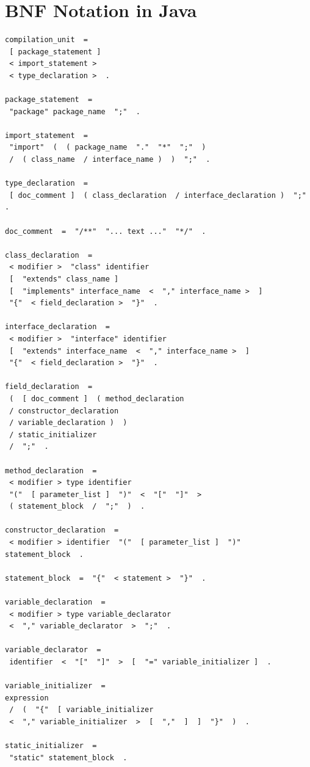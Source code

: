 \documentclass[
	12pt, %
]{fphw}
\begin{document}

\section*{{\color{Cerulean}BNF Notation in Java}}
\begin{verbatim}
compilation_unit  = 
 [ package_statement ] 
 < import_statement > 
 < type_declaration >  . 

package_statement  = 
 "package" package_name  ";"  . 

import_statement  = 
 "import"  (  ( package_name  "."  "*"  ";"  ) 
 /  ( class_name  / interface_name )  )  ";"  . 

type_declaration  = 
 [ doc_comment ]  ( class_declaration  / interface_declaration )  ";"  . 

doc_comment  =  "/**"  "... text ..."  "*/"  . 

class_declaration  = 
 < modifier >  "class" identifier 
 [  "extends" class_name ] 
 [  "implements" interface_name  <  "," interface_name >  ] 
 "{"  < field_declaration >  "}"  . 

interface_declaration  = 
 < modifier >  "interface" identifier 
 [  "extends" interface_name  <  "," interface_name >  ] 
 "{"  < field_declaration >  "}"  . 

field_declaration  = 
 (  [ doc_comment ]  ( method_declaration 
 / constructor_declaration 
 / variable_declaration )  ) 
 / static_initializer 
 /  ";"  . 

method_declaration  = 
 < modifier > type identifier 
 "("  [ parameter_list ]  ")"  <  "["  "]"  > 
 ( statement_block  /  ";"  )  . 

constructor_declaration  = 
 < modifier > identifier  "("  [ parameter_list ]  ")" 
statement_block  . 

statement_block  =  "{"  < statement >  "}"  . 

variable_declaration  = 
 < modifier > type variable_declarator 
 <  "," variable_declarator  >  ";"  . 

variable_declarator  = 
 identifier  <  "["  "]"  >  [  "=" variable_initializer ]  . 

variable_initializer  = 
expression 
 /  (  "{"  [ variable_initializer 
 <  "," variable_initializer  >  [  ","  ]  ]  "}"  )  . 

static_initializer  = 
 "static" statement_block  . 


\end{verbatim}
\end{document}
